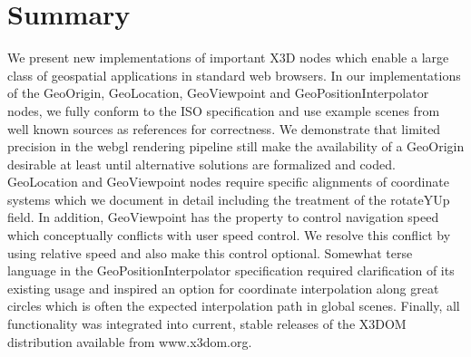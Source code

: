 \documentclass{acmsiggraph}                     %
\begin{document}
\section{Summary}

We present new implementations of important X3D nodes which enable a large class of geospatial applications in standard web browsers. In our implementations of the GeoOrigin, GeoLocation, GeoViewpoint and GeoPositionInterpolator nodes, we fully conform to the ISO specification and use example scenes from well known sources as references for correctness. We demonstrate that limited precision in the webgl rendering pipeline still make the availability of a GeoOrigin desirable at least until alternative solutions are formalized and coded. GeoLocation and GeoViewpoint nodes require specific alignments of coordinate systems which we document in detail including the treatment of the rotateYUp field. In addition, GeoViewpoint has the property to control navigation speed which conceptually conflicts with user speed control. We resolve this conflict by using relative speed and also make this control optional. Somewhat terse language in the GeoPositionInterpolator specification required clarification of its existing usage and inspired an option for coordinate interpolation along great circles which is often the expected interpolation path in global scenes. Finally, all functionality was integrated into current, stable releases of the X3DOM distribution available from www.x3dom.org.








\nocite{*}

\end{document}
